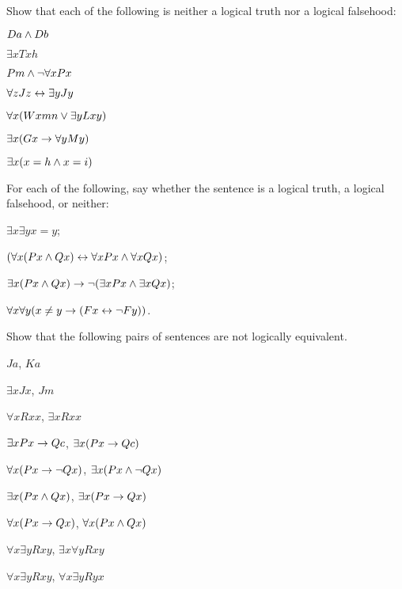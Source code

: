 
\practiceproblems



\problempart
\label{pr.Contingent}
Show that each of the following is neither a logical truth nor a logical falsehood:
\begin{earg}
\item  $Da \wedge Db$
\item  $\exists x Txh$
\item  $Pm \wedge \neg\forall x Px$
\item $\forall z Jz \leftrightarrow \exists y Jy$
\item $\forall x (Wxmn \vee \exists yLxy)$
\item $\exists x (Gx \rightarrow \forall y My)$
\item $\exists x (x = h \wedge x = i)$
\end{earg}

\problempart For each of the following, say whether the sentence is a logical truth, a logical falsehood, or neither: \begin{earg}
	\item $\exists x \exists y x=y$;
	\item $(\forall x (Px\wedge Qx)\leftrightarrow \forall x Px\wedge \forall x Qx)$;
	\item $\exists x (Px\wedge Qx) \rightarrow \neg (\exists x Px\wedge \exists x Qx)$;
	\item $\forall x \forall y (x \neq y \rightarrow (Fx \leftrightarrow \neg Fy))$.
\end{earg}


\solutions
\problempart
\label{pr.NotEquiv}
Show that the following pairs of sentences are not logically equivalent.
\begin{earg}
\item $Ja$, $Ka$
\item $\exists x Jx$, $Jm$
\item $\forall x Rxx$, $\exists x Rxx$
\item $\exists x Px \rightarrow Qc$, $\exists x (Px \rightarrow Qc)$
\item $\forall x(Px \rightarrow \neg Qx)$, $\exists x(Px \wedge \neg Qx)$
\item $\exists x(Px \wedge Qx)$, $\exists x(Px \rightarrow Qx)$
\item $\forall x(Px\rightarrow Qx)$, $\forall x(Px \wedge Qx)$
\item $\forall x\exists y Rxy$, $\exists x\forall y Rxy$
\item $\forall x\exists y Rxy$, $\forall x\exists y Ryx$
\end{earg}



